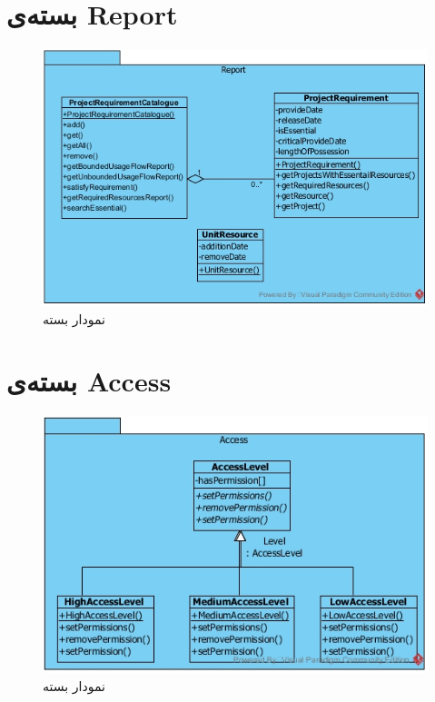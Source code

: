 \section{بسته‌ی Report}
\begin{figure}[H]
	\centering
	\includegraphics[scale=0.8]{img/pkg/ReportPackage}
	\caption{نمودار بسته}
\end{figure}
\section{بسته‌ی Access}
\begin{figure}[H]
	\centering
	\includegraphics[scale=0.8]{img/pkg/AccessPackage}
	\caption{نمودار بسته}
\end{figure}